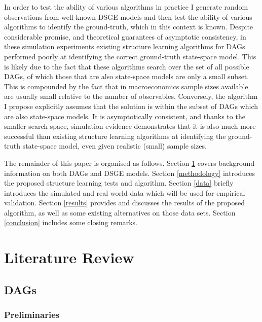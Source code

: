 \documentclass{article}
\begin{document}
In order to test the ability of various algorithms in practice I generate random observations from well known DSGE models and then test the ability of various algorithms to identify the ground-truth, which in this context is known. Despite considerable promise, and theoretical guarantees of asymptotic consistency, in these simulation experiments existing structure learning algorithms for DAGs performed poorly at identifying the correct ground-truth state-space model. This is likely due to the fact that these algorithms search over the set of all possible DAGs, of which those that are also state-space models are only a small subset. This is compounded by the fact that in macroeconomics sample sizes available are usually small relative to the number of observables. Conversely, the algorithm I propose explicitly assumes that the solution is within the subset of DAGs which are also state-space models. It is asymptotically consistent, and thanks to the smaller search space, simulation evidence demonstrates that it is also much more successful than existing structure learning algorithms at identifying the ground-truth state-space model, even given realistic (small) sample sizes.

The remainder of this paper is organised as follows. Section \ref{lit_review} covers background information on both DAGs and DSGE models. Section \ref{methodology} introduces the proposed structure learning tests and algorithm. Section \ref{data} briefly introduces the simulated and real world data which will be used for empirical validation. Section \ref{results} provides and discusses the results of the proposed algorithm, as well as some existing alternatives on those data sets. Section \ref{conclusion} includes some closing remarks.

\section{Literature Review} \label{lit_review}

\subsection{DAGs} \label{dags}

\subsubsection{Preliminaries} \label{prelim}
\end{document}
